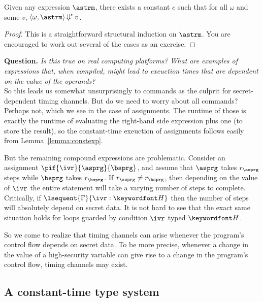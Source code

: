 \documentclass[11pt,twoside]{scrartcl}
\begin{document}
\begin{lemma}
\label{lemma:constexp}
Given any expression $\astrm$, there exists a constant $c$ such that for all $\omega$ and some $v$, $\langle\omega,\astrm\rangle \bigstep^c v$.
\end{lemma}
\begin{proof}
This is a straightforward structural induction on $\astrm$. You are encouraged to work out several of the cases as an exercise.
\end{proof}

\textbf{Question.} \emph{Is this true on real computing platforms? What are examples of expressions that, when compiled, might lead to exeuction times that are dependent on the value of the operands?}
\\

So this leads us somewhat unsurprisingly to commands as the culprit for secret-dependent timing channels. But do we need to worry about all commands? Perhaps not, which we see in the case of assignments. The runtime of those is exactly the runtime of evaluating the right-hand side expression plus one (to store the result), so the constant-time exeuction of assignments follows easily from Lemma~\ref{lemma:constexp}.

But the remaining compound expressions are problematic. Consider an assignment $\pif{\ivr}{\asprg}{\bsprg}$, and assume that $\asprg$ takes $r_\asprg$ steps while $\bsprg$ takes $r_\bsprg$. If $r_\asprg \ne r_\bsprg$, then depending on the value of $\ivr$ the entire statement will take a varying number of steps to complete. Critically, if $\lsequent{\Gamma}{\ivr : \hisec}$ then the number of steps will absolutely depend on secret data. It is not hard to see that the exact same situation holds for  loops guarded by condition $\ivr$ typed $\hisec$.

So we come to realize that timing channels can arise whenever the program's control flow depends on secret data. To be more precise, whenever a change in the value of a high-security variable can give rise to a change in the program's control flow, timing channels may exist.

\subsection{A constant-time type system}
\end{document}
